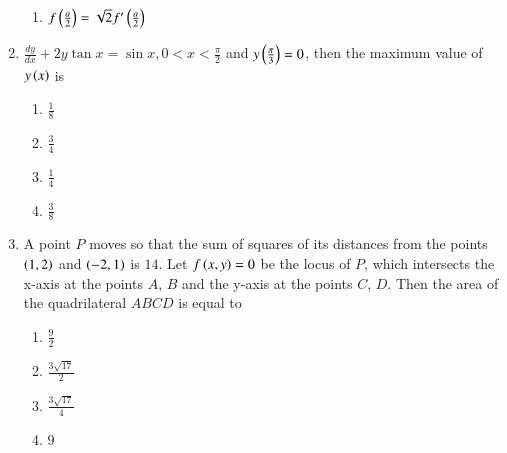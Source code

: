 \documentclass[journal]{IEEEtran}
\begin{document}
\begin{enumerate}
\begin{multicols}{2}
\begin{enumerate}
                \item $f\left(\frac{a}{2}\right) = \sqrt{2}f^{\prime}\left(\frac{a}{2}\right)$
            \end{enumerate}
        \end{multicols}
        \item $\frac{dy}{dx} + 2y \tan x = \sin x, 0<x<\frac{\pi}{2}$ and $y\left(\frac{\pi}{3}\right) = 0$, then the maximum value of $y\left(x\right)$ is
        \begin{multicols}{2}
            \begin{enumerate}
                \item $\frac{1}{8}$
                \item $\frac{3}{4}$
                \item $\frac{1}{4}$
                \item $\frac{3}{8}$
            \end{enumerate}
        \end{multicols}

        \item A point $P$ moves so that the sum of squares of its distances from the points $\left(1,2\right)$ and $\left(-2,1\right)$ is $14$. Let $f\left(x,y\right) = 0$ be the locus of $P$, which intersects the x-axis at the points $A$, $B$ and the y-axis at the points $C$, $D$. Then the area of the quadrilateral $ABCD$ is equal to
        \begin{multicols}{2}
            \begin{enumerate}
                \item $\frac{9}{2}$
                \item $\frac{3\sqrt{17}}{2}$
                \item $\frac{3\sqrt{17}}{4}$
                \item $9$
                

\end{enumerate}
\end{multicols}
\end{enumerate}
\end{document}
